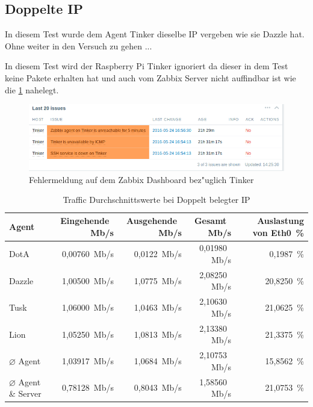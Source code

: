 \subsection{Doppelte IP}

In diesem Test wurde dem Agent Tinker dieselbe IP vergeben wie sie Dazzle hat. Ohne weiter in den Versuch zu gehen ...

In diesem Test wird der Raspberry Pi Tinker ignoriert da dieser in dem Test keine Pakete erhalten hat und auch vom %
Zabbix Server nicht auffindbar ist wie die \cref{fig:fehlermeldungenTinker} nahelegt.

\begin{figure}[htbp]
\centering
\includegraphics*[width=0.9\linewidth]{Abb/ZabbixTinker/DoppelteIP/TinkerFaults}

\caption{Fehlermeldung auf dem Zabbix Dashboard bez"uglich Tinker}
\label{fig:fehlermeldungenTinker}
\end{figure}

\begin{table}
\centering
\begin{tabular}{l%
 r<{\,Mb/s}%
 r<{\,Mb/s}%
 r<{\,Mb/s}%
 r<{\,\%}%
}
Agent  				& Eingehende		& Ausgehende		& Gesamt		& Auslastung von Eth0	\\
\hline
DotA				& 0,00760		& 0,0122		& 0,01980		&  0,1987 		\\
Dazzle 				& 1,00500		& 1,0775		& 2,08250		& 20,8250		\\
Tusk 				& 1,06000		& 1,0463		& 2,10630		& 21,0625		\\
Lion				& 1,05250		& 1,0813		& 2,13380		& 21,3375		\\
$\diameter $ Agent 		& 1,03917 		& 1,0684 		& 2,10753		& 15,8562 		\\   
$\diameter $ Agent \& Server 	& 0,78128 		& 0,8043		& 1,58560		& 21,0753		\\

\end{tabular}
\caption{Traffic Durchschnittswerte bei Doppelt belegter IP}
\label{tab:DoppelteIPTraffic}
\end{table}


